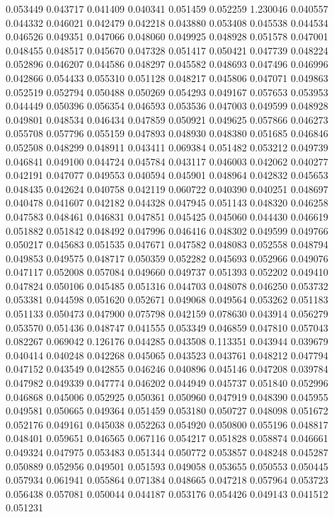 0.053449
0.043717
0.041409
0.040341
0.051459
0.052259
1.230046
0.040557
0.044332
0.046021
0.042479
0.042218
0.043880
0.053408
0.045538
0.044534
0.046526
0.049351
0.047066
0.048060
0.049925
0.048928
0.051578
0.047001
0.048455
0.048517
0.045670
0.047328
0.051417
0.050421
0.047739
0.048224
0.052896
0.046207
0.044586
0.048297
0.045582
0.048693
0.047496
0.046996
0.042866
0.054433
0.055310
0.051128
0.048217
0.045806
0.047071
0.049863
0.052519
0.052794
0.050488
0.050269
0.054293
0.049167
0.057653
0.053953
0.044449
0.050396
0.056354
0.046593
0.053536
0.047003
0.049599
0.048928
0.049801
0.048534
0.046434
0.047859
0.050921
0.049625
0.057866
0.046273
0.055708
0.057796
0.055159
0.047893
0.048930
0.048380
0.051685
0.046846
0.052508
0.048299
0.048911
0.043411
0.069384
0.051482
0.053212
0.049739
0.046841
0.049100
0.044724
0.045784
0.043117
0.046003
0.042062
0.040277
0.042191
0.047077
0.049553
0.040594
0.045901
0.048964
0.042832
0.045653
0.048435
0.042624
0.040758
0.042119
0.060722
0.040390
0.040251
0.048697
0.040478
0.041607
0.042182
0.044328
0.047945
0.051143
0.048320
0.046258
0.047583
0.048461
0.046831
0.047851
0.045425
0.045060
0.044430
0.046619
0.051882
0.051842
0.048492
0.047996
0.046416
0.048302
0.049599
0.049766
0.050217
0.045683
0.051535
0.047671
0.047582
0.048083
0.052558
0.048794
0.049853
0.049575
0.048717
0.050359
0.052282
0.045693
0.052966
0.049076
0.047117
0.052008
0.057084
0.049660
0.049737
0.051393
0.052202
0.049410
0.047824
0.050106
0.045485
0.051316
0.044703
0.048078
0.046250
0.053732
0.053381
0.044598
0.051620
0.052671
0.049068
0.049564
0.053262
0.051183
0.051133
0.050473
0.047900
0.075798
0.042159
0.078630
0.043914
0.056279
0.053570
0.051436
0.048747
0.041555
0.053349
0.046859
0.047810
0.057043
0.082267
0.069042
0.126176
0.044285
0.043508
0.113351
0.043944
0.039679
0.040414
0.040248
0.042268
0.045065
0.043523
0.043761
0.048212
0.047794
0.047152
0.043549
0.042855
0.046246
0.040896
0.045146
0.047208
0.039784
0.047982
0.049339
0.047774
0.046202
0.044949
0.045737
0.051840
0.052996
0.046868
0.045006
0.052925
0.050361
0.050960
0.047919
0.048390
0.045955
0.049581
0.050665
0.049364
0.051459
0.053180
0.050727
0.048098
0.051672
0.052176
0.049161
0.045038
0.052263
0.054920
0.050800
0.055196
0.048817
0.048401
0.059651
0.046565
0.067116
0.054217
0.051828
0.058874
0.046661
0.049324
0.047975
0.053483
0.051344
0.050772
0.053857
0.048248
0.045287
0.050889
0.052956
0.049501
0.051593
0.049058
0.053655
0.050553
0.050445
0.057934
0.061941
0.055864
0.071384
0.048665
0.047218
0.057964
0.053723
0.056438
0.057081
0.050044
0.044187
0.053176
0.054426
0.049143
0.041512
0.051231
